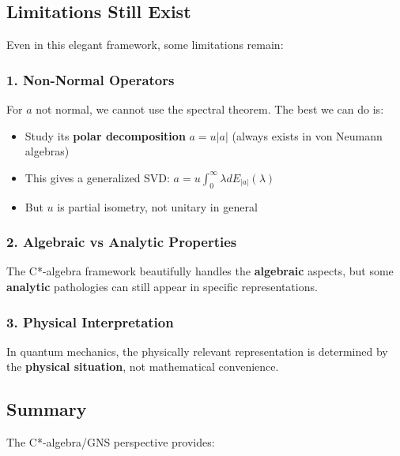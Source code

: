 \documentclass[aps,prl,reprint]{revtex4-2}
\begin{document}
\subsection*{Limitations Still Exist}

Even in this elegant framework, some limitations remain:

\subsubsection*{1. Non-Normal Operators}

For $a$ not normal, we cannot use the spectral theorem. The best we can do
is:

\begin{itemize}
\item Study its \textbf{polar decomposition} $a = u|a|$ (always exists in
von Neumann algebras)

\item This gives a generalized SVD: $a = u\int_0^\infty \lambda
dE_{|a|}(\lambda)$

\item But $u$ is partial isometry, not unitary in general
\end{itemize}

\subsubsection*{2. Algebraic vs Analytic Properties}

The C*-algebra framework beautifully handles the \textbf{algebraic} aspects,
but some \textbf{analytic} pathologies can still appear in specific
representations.

\subsubsection*{3. Physical Interpretation}

In quantum mechanics, the physically relevant representation is determined
by the \textbf{physical situation}, not mathematical convenience.

\subsection*{Summary}

The C*-algebra/GNS perspective provides:
\end{document}

